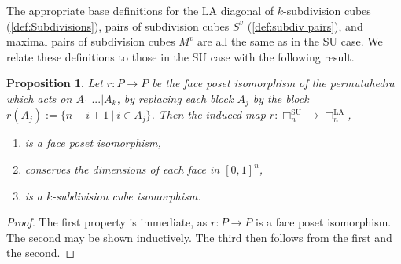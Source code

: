 \documentclass{amsart}
\newtheorem{proposition}[theorem]{Proposition}
\theoremstyle{definition}
\newcommand{\SU}{\mathrm{SU}}
\newcommand{\LA}{\mathrm{LA}}
\newcommand{\divcube}[1]{\Box_{#1}}
\newcommand{\subdivpairsv}{S^v}
\newcommand{\maxsubdivpairsv}{M^v}
\begin{document}
The appropriate base definitions for the $\LA$ diagonal of $k$-subdivision cubes (\ref{def:Subdivisions}),  pairs of subdivision cubes ${\subdivpairsv}$ (\ref{def:subdiv pairs}), and maximal pairs of subdivision cubes $\maxsubdivpairsv$ are all the same as in the $\SU$ case.
We relate these definitions to those in the $\SU$ case with the following result.
\begin{proposition}\label{prop:r is a k-subdiv cube isomorphism}
Let $r:P\to P$ be the face poset isomorphism of the permutahedra which acts on $A_1|...|A_k$, by replacing each block $A_j$ by the block $r(A_j):=\{n-i+1 \ | \ i \in A_j\}$.
Then the induced map $r:\divcube{n}^{\SU}\to \divcube{n}^{\LA}$,
\begin{enumerate}
    \item is a face poset isomorphism,
    \item conserves the dimensions of each face in $[0,1]^{n}$,
    \item is a $k$-subdivision cube isomorphism.
\end{enumerate}
\end{proposition}
\begin{proof}
The first property is immediate, as $r:P\to P$ is a face poset isomorphism.
The second may be shown inductively.
The third then follows from the first and the second.
\end{proof}
\end{document}
